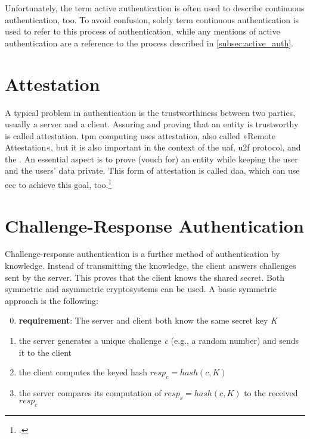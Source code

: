 Unfortunately, the term active authentication is often used to describe continuous authentication, too. To avoid confusion, solely term continuous authentication is used to refer to this process of authentication, while any mentions of active authentication are a reference to the process described in \autoref{subsec:active_auth}.

\section{Attestation}

A typical problem in authentication is the trustworthiness between two parties, usually a server and a client. Assuring and proving that an entity is trustworthy is called attestation. \Gls{tpm} computing uses attestation, also called »Remote Attestation«, but it is also important in the context of the \gls{uaf}, \gls{u2f} protocol, and the \wa. An essential aspect is to prove (\frqq vouch for\flqq) an entity while keeping the user and the users' data private. This form of attestation is called \gls{daa}, which can use \gls{ecc} to achieve this goal, too.\footcites[See][]{trusted-comp}[See][501]{Mayes2017}[See][4]{Coker:2011:PRA:1989153.1989155}[See][100]{2178405}[See][226]{10.1007/978-3-642-12510-2_16}

\section{Challenge-Response Authentication}

Challenge-response authentication is a further method of authentication by knowledge. Instead of transmitting the knowledge, the client answers challenges sent by the server. This proves that the client knows the shared secret. Both symmetric and asymmetric cryptosystems can be used. A basic symmetric approach is the following:

\begin{enumerate}
	\setcounter{enumi}{-1} 
	\item \textbf{requirement}: The server and client both know the same secret key \textit{K}
	\item the server generates a unique challenge \textit{c} (e.g., a random number) and sends it to the client 
	\item the client computes the keyed hash \(resp_c = hash(c, K)\)
	\item the server compares its computation of \(resp_s = hash(c, K)\) to the received \textit{\(resp_c\)}
\end{enumerate}

